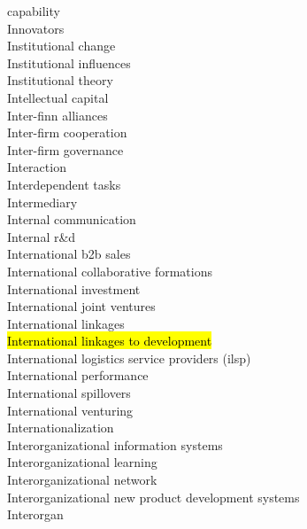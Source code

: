 \documentclass[a4paper]{article}
\begin{document}
\begin{multicols*}{2}
\begin{footnotesize}
capability \\ Innovators \\ Institutional change \\ Institutional influences \\ Institutional theory \\ Intellectual capital \\ Inter-finn alliances \\ Inter-firm cooperation \\ Inter-firm governance \\ Interaction \\ Interdependent tasks \\ Intermediary \\ Internal communication \\ Internal r\&d \\ International b2b sales \\ International collaborative formations \\ International investment \\ International joint ventures \\ International linkages \\ \hl{International linkages to development} \\ International logistics service providers (ilsp) \\ International performance \\ International spillovers \\ International venturing \\ Internationalization \\ Interorganizational information systems \\ Interorganizational learning \\ Interorganizational network \\ Interorganizational new product development systems \\ Interorgan
\end{footnotesize}
\end{multicols*}
\end{document}
